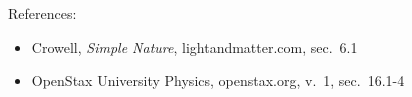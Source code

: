 References:
\begin{itemize}
\item Crowell, \emph{Simple Nature}, lightandmatter.com, sec.~6.1
\item OpenStax University Physics, openstax.org, v.~1, sec.~16.1-4
\end{itemize}

